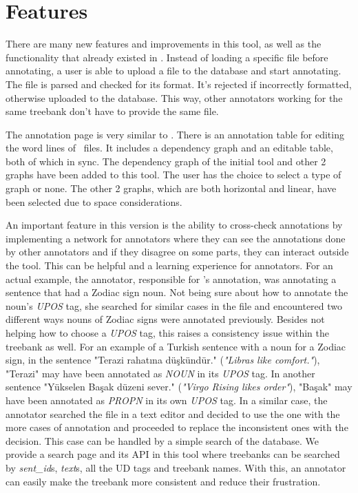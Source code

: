 \section{Features}

There are many new features and improvements in this tool, as well as the functionality that already existed in \boatvone.
Instead of loading a specific file before annotating, a user is able to upload a \conllu{} file to the database and start annotating.
The file is parsed and checked for its format. It's rejected if incorrectly formatted, otherwise uploaded to the database.
This way, other annotators working for the same treebank don't have to provide the same file.

The annotation page is very similar to \boatvone.
There is an annotation table for editing the word lines of \conllu\ files.
It includes a dependency graph and an editable table, both of which in sync.
The dependency graph of the initial tool and other 2 graphs have been added to this tool.
The user has the choice to select a type of graph or none.
The other 2 graphs, which are both horizontal and linear, have been selected due to space considerations.

An important feature in this version is the ability to cross-check annotations by implementing a network for annotators where they can see the annotations done by other annotators and if they disagree on some parts, they can interact outside the tool.
This can be helpful and a learning experience for annotators.
For an actual example, the annotator, responsible for \bountreebank{}'s annotation, was annotating a sentence that had a Zodiac sign noun.
Not being sure about how to annotate the noun's \textit{UPOS} tag, she searched for similar cases in the \conllu{} file and encountered two different ways nouns of Zodiac signs were annotated previously.
Besides not helping how to choose a \textit{UPOS} tag, this raises a consistency issue within the treebank as well.
For an example of a Turkish sentence with a noun for a Zodiac sign, in the sentence "Terazi rahatına düşkündür." (\textit{"Libras like comfort."}), "Terazi" may have been annotated as \textit{NOUN} in its \textit{UPOS} tag.
In another sentence "Yükselen Başak düzeni sever." (\textit{"Virgo Rising likes order"}), "Başak" may have been annotated as \textit{PROPN} in its own \textit{UPOS} tag.
In a similar case, the annotator searched the \conllu{} file in a text editor and decided to use the one with the more cases of annotation and proceeded to replace the inconsistent ones with the decision.
This case can be handled by a simple search of the database.
We provide a search page and its API in this tool where treebanks can be searched by \textit{sent\_id}s, \textit{text}s, all the UD tags and treebank names.
With this, an annotator can easily make the treebank more consistent and reduce their frustration.

